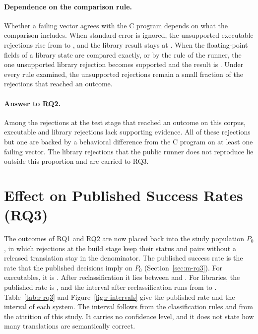 \paragraph{Dependence on the comparison rule.} Whether a failing vector agrees with the C program depends on what the comparison includes. When standard error is ignored, the unsupported executable rejections rise from  to , and the library result stays at . When the floating-point fields of a library state are compared exactly, or by the rule of the runner, the one unsupported library rejection becomes supported and the result is . Under every rule examined, the unsupported rejections remain a small fraction of the rejections that reached an outcome.

\paragraph{Answer to RQ2.} Among the rejections at the test stage that reached an outcome on this corpus,  executable and  library rejections lack supporting evidence. All of these rejections but one are backed by a behavioral difference from the C program on at least one failing vector. The \rqRZeroTestRNonrepLibAllNum{} library rejections that the public runner does not reproduce lie outside this proportion and are carried to RQ3.

\section{Effect on Published Success Rates (RQ3)}\label{sec:r-rq3}

The outcomes of RQ1 and RQ2 are now placed back into the study population $P_0$, in which rejections at the build stage keep their status and pairs without a released translation stay in the denominator. The published success rate is the rate that the published decisions imply on $P_0$ (Section~\ref{sec:m-rq3}). For executables, it is . After reclassification it lies between  and . For libraries, the published rate is , and the interval after reclassification runs from  to . Table~\ref{tab:r-rq3} and Figure~\ref{fig:r-intervals} give the published rate and the interval of each system. The interval follows from the classification rules and from the attrition of this study. It carries no confidence level, and it does not state how many translations are semantically correct.

